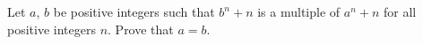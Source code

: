 Let $a$,  $b$ be positive integers such that $b^n+n$ is a multiple of $a^n+n$ for all positive integers $n$. Prove that $a=b$.